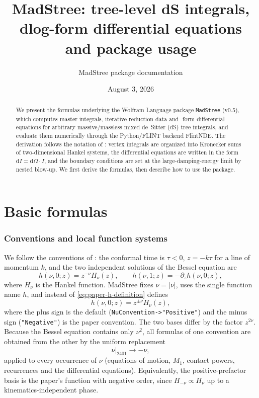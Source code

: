 \documentclass[11pt,a4paper]{article}
\title{MadStree: tree-level dS integrals, \texorpdfstring{dlog}{dlog}-form differential equations and package usage}
\author{MadStree package documentation}
\date{August 3, 2026}
\newcommand{\dd}{\mathrm d}
\begin{document}
\maketitle

\begin{abstract}
We present the formulas underlying the Wolfram Language package \texttt{MadStree} (v0.5), which
computes master integrals, iterative reduction data and -form differential equations for
arbitrary massive/massless mixed de~Sitter (dS) tree integrals, and evaluate them numerically
through the Python/FLINT backend FlintNDE. The derivation follows the notation of
\citet{Chen:2023eic,Chen:2024jms}: vertex integrals are organized into Kronecker sums of
two-dimensional Hankel systems, the differential equations are written in the form
$\dd I=\dd\Omega\cdot I$, and the boundary conditions are set at the large-damping-energy limit by
nested blow-up. We first derive the formulas, then describe how to use the package.
\end{abstract}

\tableofcontents

\part{Basic formulas}

\section{Conventions and local function systems}
\label{sec:conventions}

We follow the conventions of \citet{Chen:2023eic}: the conformal time is $\tau<0$, $z=-k\tau$ for a
line of momentum $k$, and the two independent solutions of the Bessel equation are
\begin{equation}
  h(\nu,0;z)=z^{-\nu}H_{\nu}(z),
  \qquad
  h(\nu,1;z)=-\partial_z h(\nu,0;z),
  \label{eq:paper-h-definition}
\end{equation}
where $H_\nu$ is the Hankel function. MadStree fixes $\nu=|\nu|$, uses the single function name
$h$, and instead of \eqref{eq:paper-h-definition} defines
\begin{equation}
  h(\nu,0;z)=z^{\pm\nu}H_\nu(z),
  \label{eq:positive-order-h}
\end{equation}
where the plus sign is the default (\texttt{NuConvention->"Positive"}) and the minus sign
(\texttt{"Negative"}) is the paper convention.
The two bases differ by the factor $z^{2\nu}$. Because the Bessel equation contains only $\nu^2$,
all formulas of one convention are obtained from the other by the uniform replacement
\begin{equation}
  \left.\nu\right|_{2401}\longrightarrow-\nu,
  \label{eq:paper-to-positive-order}
\end{equation}
applied to every occurrence of $\nu$ (equations of motion, $M_1$, contact powers, recurrences and
the differential equations). Equivalently, the positive-prefactor basis is the paper's function with
negative order, since $H_{-\nu}\propto H_\nu$ up to a kinematics-independent phase.
\end{document}
